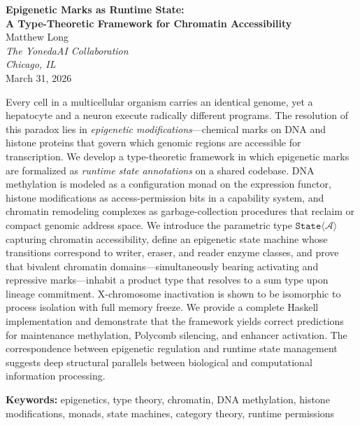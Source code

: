 \documentclass[12pt,a4paper]{article}
\newcommand{\StateT}{\texttt{State}}
\begin{document}
\begin{center}
    {\LARGE\bfseries Epigenetic Marks as Runtime State:\\[4pt]
    A Type-Theoretic Framework for Chromatin Accessibility}\\[16pt]
    {\large Matthew Long}\\[4pt]
    {\itshape The YonedaAI Collaboration}\\
    {\itshape Chicago, IL}\\[8pt]
    {\small March 31, 2026}
\end{center}

\begin{onecolabstract}
\noindent
Every cell in a multicellular organism carries an identical genome, yet a hepatocyte and a neuron execute radically different programs. The resolution of this paradox lies in \emph{epigenetic modifications}---chemical marks on DNA and histone proteins that govern which genomic regions are accessible for transcription. We develop a type-theoretic framework in which epigenetic marks are formalized as \emph{runtime state annotations} on a shared codebase. DNA methylation is modeled as a configuration monad on the expression functor, histone modifications as access-permission bits in a capability system, and chromatin remodeling complexes as garbage-collection procedures that reclaim or compact genomic address space. We introduce the parametric type $\StateT\langle\mathcal{A}\rangle$ capturing chromatin accessibility, define an epigenetic state machine whose transitions correspond to writer, eraser, and reader enzyme classes, and prove that bivalent chromatin domains---simultaneously bearing activating and repressive marks---inhabit a product type that resolves to a sum type upon lineage commitment. X-chromosome inactivation is shown to be isomorphic to process isolation with full memory freeze. We provide a complete Haskell implementation and demonstrate that the framework yields correct predictions for maintenance methylation, Polycomb silencing, and enhancer activation. The correspondence between epigenetic regulation and runtime state management suggests deep structural parallels between biological and computational information processing.
\end{onecolabstract}

\vspace{6pt}
\noindent\textbf{Keywords:} epigenetics, type theory, chromatin, DNA methylation, histone modifications, monads, state machines, category theory, runtime permissions
\end{document}

